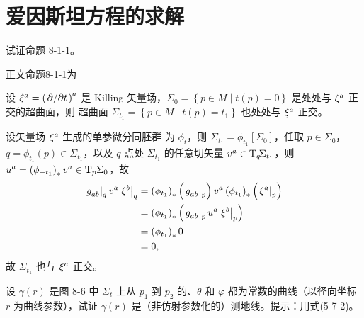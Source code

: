 
\chapter{爱因斯坦方程的求解}

\begin{xiti}
    \item 试证命题 8-1-1。
    
    \begin{zm}
        正文命题8-1-1为
        \begin{Proposition}
            设 $\tensor{\xi}{^a} = \tensor{\left( \pdv*{t} \right)}{^a} $ 是 Killing 矢量场，$\Sigma_0 = \left\{ p \in M \mid t(p) = 0 \right\}$ 是处处与 $\tensor{\xi}{^a}$ 正交的超曲面，则 超曲面 $\Sigma_{t_1} = \left\{ p \in M \mid t(p) = t_1 \right\}$ 也处处与 $\tensor{\xi}{^a}$ 正交。
        \end{Proposition}

        \begin{Proof}
            设矢量场 $\tensor{\xi}{^a}$ 生成的单参微分同胚群 为 $\phi_t$，则 $\Sigma_{t_1} = \phi_{t_1} \left[ \Sigma_0 \right]$，任取 $p \in \Sigma_0$，$q = \phi_{t_1}(p) \in \Sigma_{t_1}$，以及 $q$ 点处 $\Sigma_{t_1}$ 的任意切矢量 $\tensor{v}{^a} \in \TB[q]{\Sigma_{t_1}}$，则 $\tensor{u}{^a} = \left( \phi_{-t_1} \right)_* \tensor{v}{^a} \in \TBx[p]{\Sigma_0}$，故
            \begin{equation*}
                \begin{split}
                    \left.\tensor{g}{_a_b}\right|_{q} \tensor{v}{^a} \left.\tensor{\xi}{^b}\right|_q &= \left( \phi_{t_1} \right)_* \left( \left. \tensor{g}{_a_b} \right|_{p} \right) \tensor{v}{^a} \left( \phi_{t_1} \right)_* \left( \left. \tensor{\xi}{^a} \right|_p \right)\\
                    &= \left( \phi_{t_1} \right)_* \left( \left. \tensor{g}{_a_b} \right|_p \tensor{u}{^a} \left. \tensor{\xi}{^b} \right|_p \right)\\
                    &= \left( \phi_{t_1} \right)_* 0\\
                    &= 0,
                \end{split}
            \end{equation*}
            故 $\Sigma_{t_1}$ 也与 $\tensor{\xi}{^a}$ 正交。
        \end{Proof}  
    \end{zm}
    
    \item 设 $\gamma(r)$ 是图 8-6 中 $\Sigma_{t}$ 上从 $p_1$ 到 $p_2$ 的、$\theta$ 和 $\varphi$ 都为常数的曲线（以径向坐标 $r$ 为曲线参数），试证 $\gamma(r)$ 是（非仿射参数化的）测地线。提示：用式(5-7-2)。
    

\end{xiti}
